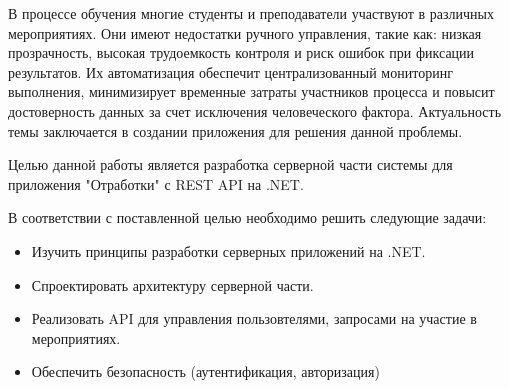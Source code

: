 \intro

В процессе обучения многие студенты и преподаватели участвуют в различных мероприятиях. Они имеют недостатки ручного управления, такие как: низкая прозрачность, высокая трудоемкость контроля и риск ошибок при фиксации результатов. Их автоматизация обеспечит централизованный мониторинг выполнения, минимизирует временные затраты участников процесса и повысит достоверность данных за счет исключения человеческого фактора. Актуальность темы заключается в создании приложения для решения данной проблемы.

Целью данной работы является разработка серверной части системы для приложения "Отработки" с REST API на .NET.

В соответствии с поставленной целью необходимо решить следующие задачи:
\begin{itemize}
	\item{Изучить принципы разработки серверных приложений на .NET.}
	\item{Спроектировать архитектуру серверной части.}
	\item{Реализовать API для управления пользовтелями, запросами на участие в мероприятиях.}
	\item{Обеспечить безопасность (аутентификация, авторизация)}
\end{itemize}
